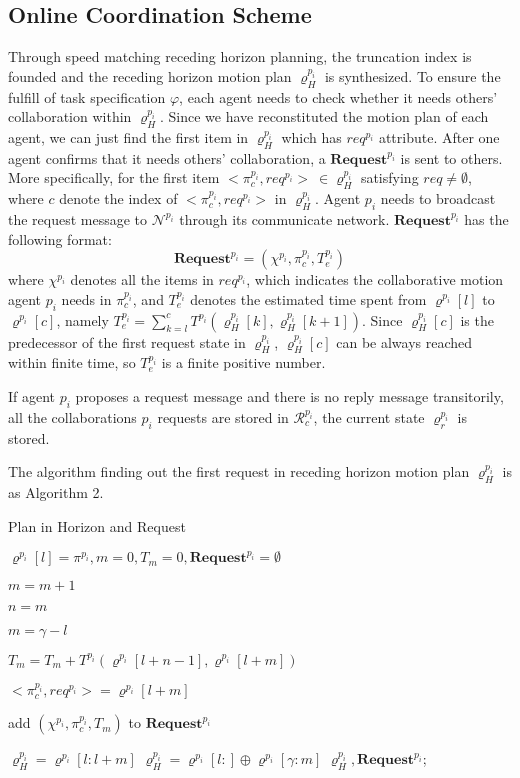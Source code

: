 \documentclass[journal]{IEEEtran}
\begin{document}
\subsection{Online Coordination Scheme}
Through speed matching receding horizon planning, the truncation index is founded and the receding horizon motion plan $\varrho^{p_i}_H$ is synthesized. To ensure the fulfill of task specification $\varphi$, each agent needs to check whether it needs others' collaboration within $\varrho^{p_i}_H$. Since we have reconstituted the motion plan of each agent, we can just find the first item in $\varrho^{p_i}_H$ which has $req^{p_i}$ attribute.  After one agent confirms that it needs others' collaboration, a $\textbf{Request}^{p_i}$ is sent to others. More specifically, for the first item $<\pi_c^{p_i},req^{p_i}>\ \in \varrho^{p_i}_H$ satisfying $req \neq \emptyset$, where $c$ denote the index of $<\pi_c^{p_i},req^{p_i}>$ in $\varrho^{p_i}_H$. Agent $p_i$ needs to broadcast the request message to $\mathcal{N}^{p_i}$ through its communicate network. $\textbf{Request}^{p_i}$ has the following format:
$$\textbf{Request}^{p_i} = (\chi^{p_i},\pi_c^{p_i},T^{p_i}_e)$$
where $\chi^{p_i}$ denotes all the items in $req^{p_i}$, which indicates the collaborative motion agent $p_i$ needs in $\pi_c^{p_i}$, and $T^{p_i}_e$ denotes the estimated time spent from $\varrho^{p_i}[l]$ to $\varrho^{p_i}[c]$, namely $T^{p_i}_e=\sum_{k=l}^{c}T^{p_i}(\varrho^{p_i}_H[k],\varrho^{p_i}_H[k+1])$. Since $\varrho^{p_i}_H[c]$ is the predecessor of the first request state in $\varrho^{p_i}_H$, $\varrho^{p_i}_H[c]$ can be always reached within finite time, so $T^{p_i}_e$ is a finite positive number.\par
If agent $p_i$ proposes a request message and there is no reply message transitorily, all the collaborations $p_i$ requests are stored in $\mathcal{R}^{p_i}_c$, the current state $\varrho^{p_i}_r$ is stored.\par
The algorithm finding out the first request in receding horizon motion plan $\varrho^{p_i}_H$ is as Algorithm 2.\par
\begin{algorithm}
  \caption{Plan in Horizon and Request}
  $\varrho^{p_i}[l]=\pi^{p_i},m=0,T_m=0,\textbf{Request}^{p_i}=\emptyset$

  {
    $m=m+1$

    $n=m$

    {
        $m=\gamma-l$
    }

    $T_m=T_m+T^{p_i}(\varrho^{p_i}[l+n-1],\varrho^{p_i}[l+m])$

    $<\pi^{p_i}_c,req^{p_i}>=\varrho^{p_i}[l+m]$

    {
        {
            add $(\chi^{p_i},\pi^{p_i}_c,T_m)$ to $\textbf{Request}^{p_i}$
        }
    }
  }
  {
    $\varrho^{p_i}_H=\varrho^{p_i}[l:l+m]$
  }
  \Else
  {
    $\varrho^{p_i}_H=\varrho^{p_i}[l:]\oplus \varrho^{p_i}[\gamma:m]$
  }
  \Return $\varrho^{p_i}_H,\textbf{Request}^{p_i}$;
\end{algorithm}
\end{document}

